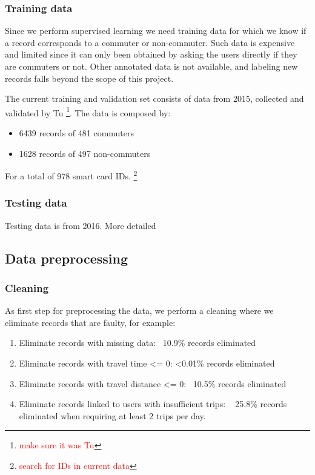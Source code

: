 \documentclass{article}
\newcommand{\selfnote}[1]{\footnote{\textcolor{red}{#1}}}
\begin{document}
\subsubsection{Training data}
Since we perform supervised learning we need training data for which we know if a record corresponds to a commuter or non-commuter. Such data is expensive and limited since it can  only been obtained by asking the users directly if they are commuters or not. Other annotated data is not available, and labeling new records falls beyond the scope of this project.

The current training and validation set consists of data from 2015, collected and validated by Tu \cite{tu2016impact} \selfnote{make sure it was Tu}. The data is composed by:

\begin{itemize}
\item 6439 records of 481 commuters
\item 1628 records of 497 non-commuters
\end{itemize}

For a total of 978 smart card IDs. \selfnote{search for IDs in current data}

\subsubsection{Testing data}
Testing data is from 2016. More detailed

\subsection{Data preprocessing}
\subsubsection{Cleaning}
As first step for preprocessing the data, we perform a cleaning where we eliminate records that are faulty, for example: 

\begin{enumerate}
\item Eliminate records with missing data: ~10.9\% records eliminated
\item Eliminate records with travel time <= 0: <0.01\% records eliminated
\item Eliminate records with travel distance <= 0: ~10.5\% records eliminated
\item Eliminate records linked to users with insufficient trips: ~ 25.8\% records eliminated when requiring at least 2 trips per day.
\end{enumerate}
\end{document}
